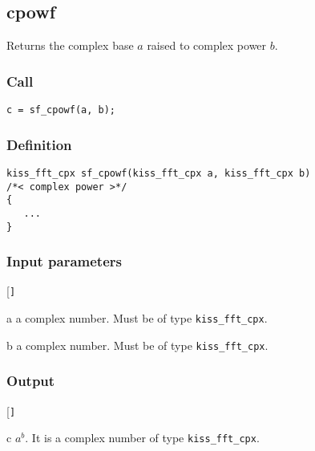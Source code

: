 \subsection{{cpowf}}
Returns the complex base $a$ raised to complex power $b$.

\subsubsection*{Call}
\begin{verbatim}c = sf_cpowf(a, b);\end{verbatim}

\subsubsection*{Definition}
\begin{verbatim}
kiss_fft_cpx sf_cpowf(kiss_fft_cpx a, kiss_fft_cpx b)
/*< complex power >*/
{
   ...
}
\end{verbatim}

\subsubsection*{Input parameters}
\begin{desclist}{\tt }{\quad}[\tt ]
   \setlength\itemsep{0pt}
   \item[a] a complex number. Must be of type \texttt{kiss\_fft\_cpx}.
   \item[b] a complex number. Must be of type \texttt{kiss\_fft\_cpx}.
\end{desclist}

\subsubsection*{Output}
\begin{desclist}{\tt }{\quad}[\tt ]
   \setlength\itemsep{0pt}
   \item[c] $a^b$. It is a complex number of type \texttt{kiss\_fft\_cpx}.
\end{desclist}



